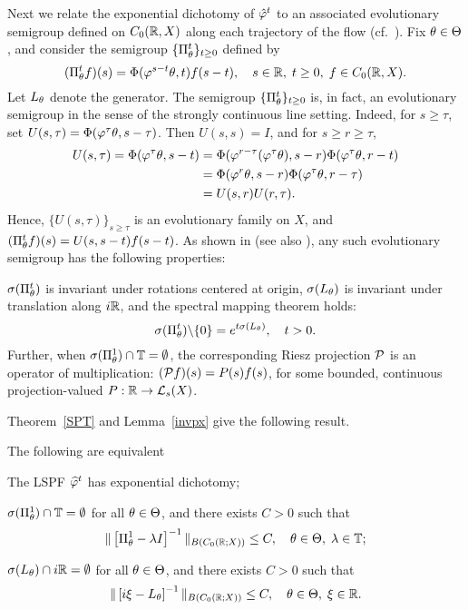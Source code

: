Next we relate the exponential dichotomy of
${\hat{\varphi}}^t$ to an associated evolutionary semigroup
defined on $C_0({\Bbb{R}},X)$ along each trajectory of the flow
(cf.~\cite{LATGDDE,LS}).  Fix $\theta\in \Theta$, and consider the semigroup
$\{\Pi_\theta^t\}_{t\ge0}$ defined by
$$
(\Pi^t_\theta f)(s)=\Phi(\varphi^{s-t}\theta, t)f(s-t),\quad s\in{\Bbb{R}},\; t\ge
0,\; f\in C_0({\Bbb{R}},X).
$$
Let $L_\theta$ denote the generator.  The semigroup
$\{\Pi_\theta^t\}_{t\ge0}$ is, in fact, an
evolutionary semigroup in the sense of the strongly continuous
line setting.  Indeed, for $s\ge \tau$, set $U(s,\tau) =
\Phi(\varphi^{\tau}\theta, s-\tau)$. Then $U(s,s) = I$, and for
$s\ge r\ge \tau$,
$$\begin{aligned}
U(s,\tau)=\Phi(\varphi^{\tau}\theta, s-t)&=\Phi(\varphi^{r-\tau}
(\varphi^{\tau}\theta), s-r) \Phi(\varphi^{\tau}\theta, r-t)\\
&=\Phi(\varphi^r\theta, s-r) \Phi(\varphi^{\tau}\theta, r-\tau) \\
&=U(s,r)U(r,\tau).
\end{aligned}$$
Hence, $\{U(s,\tau)\}_{s\ge \tau}$ is an evolutionary family
on $X$, and $(\Pi^t_\theta f)(s) = U(s,s-t) f(s-t)$.
As shown in \cite{LMS1,LMS2} (see also \cite{Rau1,Rau2}), any such
evolutionary semigroup has the following properties:

\begin{lem}
$\sigma(\Pi^t_\theta)$ is invariant under rotations centered at origin,
$\sigma(L_\theta)$ is invariant under translation along $i{\Bbb{R}}$, and the
spectral mapping theorem holds:
$$
\sigma(\Pi^t_\theta) \backslash \{0\} = e^{t\sigma(L_\theta)}, \quad t> 0.
$$
Further, when $\sigma(\Pi^1_\theta)\cap{\Bbb{T}}=\emptyset$, the
corresponding Riesz projection ${\cal{P}}$ is an operator of
multiplication: $({\cal{P}} f)(s)=P(s)f(s)$, for some
bounded, continuous projection-valued $P:{\Bbb{R}}\to {\cal{L}}_s(X)$.
\end{lem}

Theorem~\ref{SPT} and Lemma~\ref{invpx} give the following
result.
\begin{thm}
The following are equivalent
\setcounter{rr}{0}
\begin{list}{)}{}
\item  The LSPF $\widehat{\varphi}^t$ has exponential dichotomy;
\item  $\sigma(\Pi^1_\theta)\cap{\Bbb{T}} = \emptyset$ for all $\theta\in \Theta$, and
there exists $C>0$ such that
$$
\|\left[\Pi^1_\theta-\lambda I\right]^{-1} \|_{B(C_{0}({\Bbb{R}}; X))}\le C,
  \quad \theta\in \Theta,\; \lambda\in{\Bbb{T}};
$$
\item $\sigma(L_\theta)\cap i{\Bbb{R}}=\emptyset$ for all $\theta\in \Theta$, and
there exists $C>0$ such that
$$
\|\left[i\xi-L_\theta\right]^{-1}\|_{B(C_{0}({\Bbb{R}};X))}\le C,\quad \theta\in
\Theta,\; \xi\in{\Bbb{R}}.
$$
\end{list}
\end{thm}

